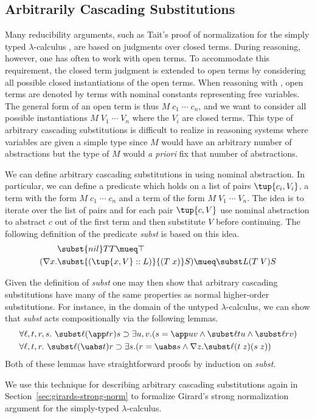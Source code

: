 \subsection{Arbitrarily Cascading Substitutions}

Many reducibility arguments, such as Tait's proof of normalization for
the simply typed $\lambda$-calculus \cite{tait67jsl}, are based on
judgments over closed terms. During reasoning, however, one has often
to work with open terms. To accommodate this requirement, the closed
term judgment is extended to open terms by considering all possible
closed instantiations of the open terms. When reasoning with \logic,
open terms are denoted by terms with nominal constants representing
free variables. The general form of an open term is thus $M\; c_1\;
\cdots\; c_n$, and we want to consider all possible instantiations
$M\; V_1\; \cdots\; V_n$ where the $V_i$ are closed terms. This type
of arbitrary cascading substitutions is difficult to realize in
reasoning systems where variables are given a simple type since $M$
would have an arbitrary number of abstractions but the type of $M$
would {\em a priori} fix that number of abstractions.

We can define arbitrary cascading substitutions in \logic using
nominal abstraction. In particular, we can define a predicate which
holds on a list of pairs $\tup{c_i,V_i}$, a term with the form $M\; c_1\;
\cdots\; c_n$ and a term of the form $M\; V_1\; \cdots\; V_n$. The
idea is to iterate over the list of pairs and for each pair $\tup{c,V}$
use nominal abstraction to abstract $c$ out of the first term and then
substitute $V$ before continuing. The following definition of the
predicate {\sl subst} is based on this idea.
\begin{align*}
& \subst {nil} T T \mueq \top \\
(\nabla x. &\subst {(\tup{x,V}::L)} {(T\; x)} S) \mueq
\subst L {(T\; V)} S
\end{align*}

Given the definition of {\sl subst} one may then show that arbitrary
cascading substitutions have many of the same properties as normal
higher-order substitutions. For instance, in the domain of the untyped
$\lambda$-calculus, we can show that {\sl subst} acts compositionally via
the following lemmas.
\begin{align*}
&\forall \ell, t, r, s.~
\subst \ell {(\app t r)} s \supset
\exists u, v. (s = \app u v \land \subst \ell t u \land \subst \ell r v)
\\
&\forall \ell, t, r.~
\subst \ell {(\uabs t)} r \supset
\exists s. (r = \uabs s \land \nabla z. \subst \ell {(t\; z)} (s\; z))
\end{align*}
Both of these lemmas have straightforward proofs by induction on {\sl
  subst}.

We use this technique for describing arbitrary cascading substitutions again in
Section~\ref{sec:girards-strong-norm} to formalize Girard's strong
normalization argument for the simply-typed $\lambda$-calculus.



